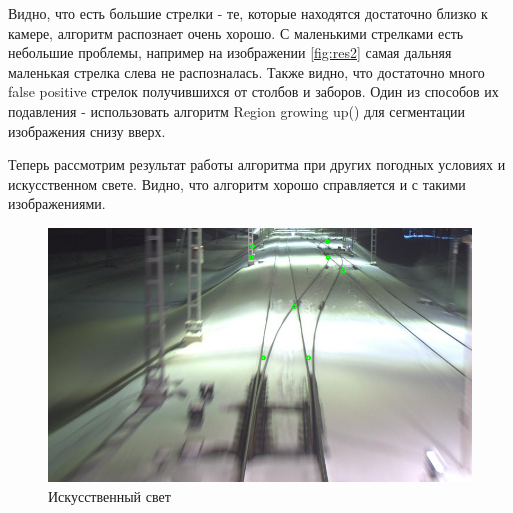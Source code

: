 Видно, что есть большие стрелки - те, которые находятся достаточно близко к камере, алгоритм распознает очень хорошо. С маленькими стрелками есть небольшие проблемы, например на изображении \ref{fig:res2} самая дальняя маленькая стрелка слева не распозналась.\newline
Также видно, что достаточно много false positive стрелок получившихся от столбов и заборов. Один из способов их подавления - использовать алгоритм Region growing up(\cite{b:growing_up}) для сегментации изображения снизу вверх.

Теперь рассмотрим результат работы алгоритма при других погодных условиях и искусственном свете. Видно, что алгоритм хорошо справляется и с такими изображениями.
\begin{figure}[!h]
	\centering
	\includegraphics[width=0.7\linewidth]{pictures/screenshot0017}
	\caption{Искусственный свет}
	\label{fig:res3}
\end{figure}

